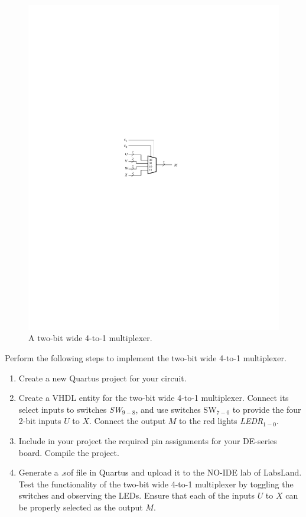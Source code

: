 \documentclass[epsfig,10pt,fullpage]{article}
\begin{document}
\begin{figure}[H]
	\begin{center}
		\includegraphics[]{figures/figure5.pdf}
	\end{center}
\caption{A two-bit wide 4-to-1 multiplexer.}
\label{fig:5}
\end{figure}

Perform the following steps to implement the two-bit wide 4-to-1 multiplexer.
\begin{enumerate}
\item Create a new Quartus project for your circuit.
\item Create a VHDL entity for the two-bit wide 4-to-1 multiplexer. Connect its select
inputs to switches {\it SW}$_{9-8}$, and use switches SW$_{7-0}$ to
provide the four 2-bit inputs $U$ to $X$. Connect the 
output $M$ to the red lights {\it LEDR}$_{1-0}$.
\item Include in your project the required pin assignments for your DE-series board.
Compile the project.
\item Generate a .sof file in Quartus and upload it to the NO-IDE lab of LabsLand. Test the functionality of the 
two-bit wide 4-to-1 multiplexer by toggling the switches and observing the LEDs. Ensure
that each of the inputs $U$ to $X$ can be properly selected as the output $M$.
\end{enumerate}
\end{document}
